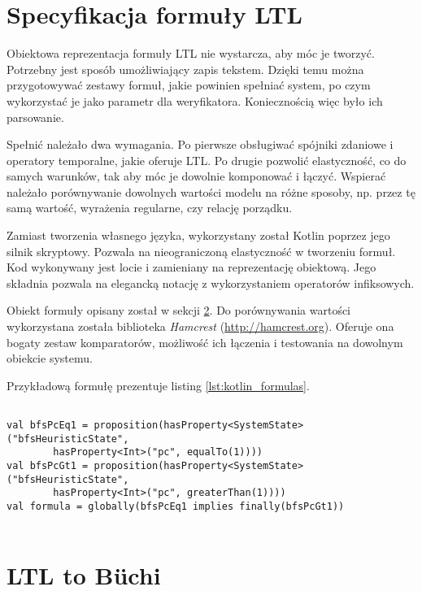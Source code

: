 \section{Specyfikacja formuły LTL} \label{sec:LTL_formula_spec}

Obiektowa reprezentacja formuły LTL nie wystarcza, aby móc je tworzyć.
Potrzebny jest sposób umożliwiający zapis tekstem.
Dzięki temu można przygotowywać zestawy formuł, jakie powinien spełniać system, po czym wykorzystać je jako parametr dla weryfikatora.
Koniecznością więc było ich parsowanie.

Spełnić należało dwa wymagania.
Po pierwsze obsługiwać spójniki zdaniowe i operatory temporalne, jakie oferuje LTL.
Po drugie pozwolić elastyczność, co do samych warunków, tak aby móc je dowolnie komponować i łączyć.
Wspierać należało porównywanie dowolnych wartości modelu na różne sposoby, np. przez tę samą wartość, wyrażenia regularne, czy relację porządku.

Zamiast tworzenia własnego języka, wykorzystany został Kotlin poprzez jego silnik skryptowy.
Pozwala na nieograniczoną elastyczność w tworzeniu formuł.
Kod wykonywany jest locie i zamieniany na reprezentację obiektową.
Jego składnia pozwala na elegancką notację z wykorzystaniem operatorów infiksowych.

Obiekt formuły opisany został w sekcji \ref{sec:ltl2buchi}.
Do porównywania wartości wykorzystana została biblioteka \textit{Hamcrest} (\url{http://hamcrest.org}).
Oferuje ona bogaty zestaw komparatorów, możliwość ich łączenia i testowania na dowolnym obiekcie systemu.

Przykładową formułę prezentuje listing \ref{lst:kotlin_formulas}.

\begin{minipage}{\linewidth}
\begin{lstlisting}[caption={Przykładowa formuły LTL w języku Kotlin.},captionpos=b,label={lst:kotlin_formulas}]

val bfsPcEq1 = proposition(hasProperty<SystemState>("bfsHeuristicState", 
        hasProperty<Int>("pc", equalTo(1))))
val bfsPcGt1 = proposition(hasProperty<SystemState>("bfsHeuristicState",
        hasProperty<Int>("pc", greaterThan(1))))
val formula = globally(bfsPcEq1 implies finally(bfsPcGt1))


\end{lstlisting}
\end{minipage}


\section{LTL to Büchi} \label{sec:ltl2buchi}

